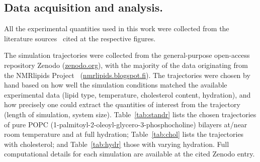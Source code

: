 \documentclass[journal=jcisd8,manuscript=article,layout=twocolumn]{achemso}
\begin{document}

\subsection*{Data acquisition and analysis.}
%
All the experimental quantities used in this work were collected from the literature sources~\cite{ferreira15,pham15,Volke:1995a,Antila:2020a} cited at the respective figures.   

%
The simulation trajectories were collected from the general-purpose open-access repository Zenodo (\url{zenodo.org}), with the majority of the data originating from the NMR\-lipids Project~\cite{botan15,catte16} (\url{nmrlipids.blogspot.fi}). The trajectories were chosen by hand based on how well the simulation conditions matched the available experimental data (lipid type, temperature, cholesterol content, hydration), and how precisely one could extract the quantities of interest from the trajectory (length of simulation, system size).
%
Table~\ref{tab:standr} lists the chosen trajectories of pure POPC (1-palmit\-oyl-2-oleoyl-glycero-3-phosphocholine) bilayers at/near room temperature and at full hydration;
Table~\ref{tab:chol} lists the trajectories with cholesterol; and
Table~\ref{tab:hydr} those with varying hydration.
Full computational details for each simulation are available at the cited Zenodo entry.
\end{document}
